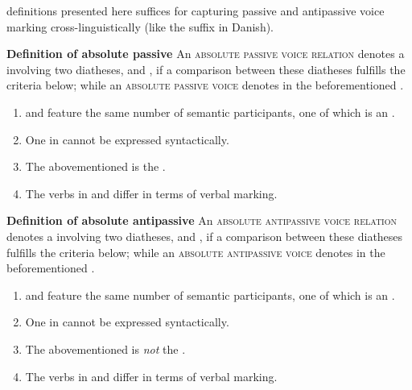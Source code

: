 definitions presented here suffices for capturing passive and antipassive voice marking cross-linguistically (like the suffix  in Danish). 

\smallskip

\noindent
\begin{center}
	\begin{minipage}{0.80\textwidth}
		\textbf{Definition of absolute passive} \newline
		An \textsc{absolute passive voice relation} denotes a  involving two diatheses,  and , if a comparison between these diatheses fulfills the criteria below; while an \textsc{absolute passive voice} denotes  in the beforementioned .
		\begin{enumerate}[label=\roman*)]
			\item {} and  feature the same number of semantic participants, one of which is an .
			\item One  in  cannot be expressed syntactically.
			\item The abovementioned  is the .
			\item The verbs in  and  differ in terms of verbal marking.
		\end{enumerate}
	\end{minipage}
\end{center}

\noindent
\begin{center}
	\begin{minipage}{0.80\textwidth}
		\textbf{Definition of absolute antipassive} \newline
		An \textsc{absolute antipassive voice relation} denotes a  involving two diatheses,  and , if a comparison between these diatheses fulfills the criteria below; while an \textsc{absolute antipassive voice} denotes  in the beforementioned .
		\begin{enumerate}[label=\roman*)]
			\item {} and  feature the same number of semantic participants, one of which is an .
			\item One  in  cannot be expressed syntactically.
			\item The abovementioned  is \textit{not} the .
			\item The verbs in  and  differ in terms of verbal marking.
		\end{enumerate}
	\end{minipage}
\end{center}

